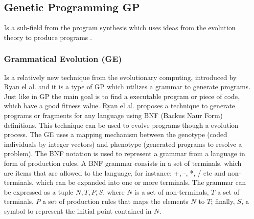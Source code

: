 \documentclass[conference]{IEEEtran}
\begin{document}
\subsection{Genetic Programming {GP}}
\label{sec:geneticprogamming}
 Is a sub-field from the program synthesis which uses ideas from the evolution theory to produce programs \cite{burke2013hyper}. 



\subsubsection{Grammatical Evolution (GE)} 


Is a relatively new technique from the evolutionary computing, introduced by Ryan el al. \cite{ryan1998grammatical} and it is a type of GP which utilizes a grammar to generate programs. Just like in GP the main goal is to find a executable program or piece of code, which have a good fitness value. Ryan el al. \cite{ryan1998grammatical} proposes a technique to generate programs or fragments for any language using BNF (Backus Naur Form) definitions. This technique can be used to evolve programs though a evolution process. The GE uses a mapping mechanism between the genotype (coded individuals by integer vectors) and phenotype (generated programs to resolve a problem). The BNF notation is used to represent a grammar from a language in form of production rules. A BNF grammar consists in a set of terminals, which are items that are allowed to the language, for instance: +, -, *, / etc and non-terminals, which can be expanded into one or more terminals. The grammar can be expressed as a tuple ${N,T,P,S}$, where $N$ is a set of non-terminals, $T$ a set of terminals, $P$ a set of production rules that maps the elements $N$ to $T$; finally, $S$, a symbol to represent the initial point contained in $N$.
 
\end{document}
